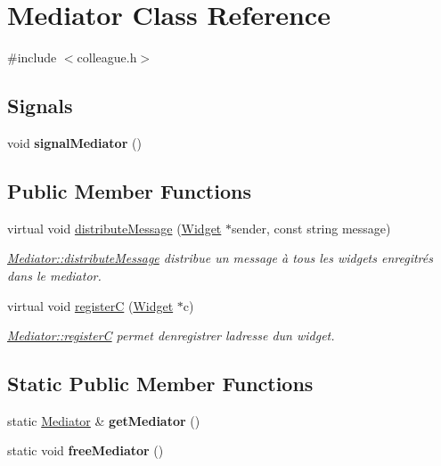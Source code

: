 \hypertarget{classMediator}{}\section{Mediator Class Reference}
\label{classMediator}


{\ttfamily \#include $<$colleague.\+h$>$}

\subsection*{Signals}
\begin{DoxyCompactItemize}
\item 
\mbox{\label{classMediator_a52b7c6839f25654bbc8b4d42d4409f60}} 
void {\bfseries signal\+Mediator} ()
\end{DoxyCompactItemize}
\subsection*{Public Member Functions}
\begin{DoxyCompactItemize}
\item 
virtual void \hyperlink{classMediator_a6d85bc8652e2fbd4f37b7ba67559c9e3}{distribute\+Message} (\hyperlink{classWidget}{Widget} $\ast$sender, const string message)
\begin{DoxyCompactList}\small\item\em \hyperlink{classMediator_a6d85bc8652e2fbd4f37b7ba67559c9e3}{Mediator\+::distribute\+Message} distribue un message à tous les widgets enregitrés dans le mediator. \end{DoxyCompactList}\item 
virtual void \hyperlink{classMediator_aeb991fe5844fcb6ccd40086369373e37}{registerC} (\hyperlink{classWidget}{Widget} $\ast$c)
\begin{DoxyCompactList}\small\item\em \hyperlink{classMediator_aeb991fe5844fcb6ccd40086369373e37}{Mediator\+::registerC} permet d\textquotesingle{}enregistrer l\textquotesingle{}adresse d\textquotesingle{}un widget. \end{DoxyCompactList}\end{DoxyCompactItemize}
\subsection*{Static Public Member Functions}
\begin{DoxyCompactItemize}
\item 
\mbox{\label{classMediator_a4f9ee710da1df5348e19a54ce4396952}} 
static \hyperlink{classMediator}{Mediator} \& {\bfseries get\+Mediator} ()
\item 
\mbox{\label{classMediator_a44737f7a290891afafa9f94832d1895c}} 
static void {\bfseries free\+Mediator} ()
\end{DoxyCompactItemize}
